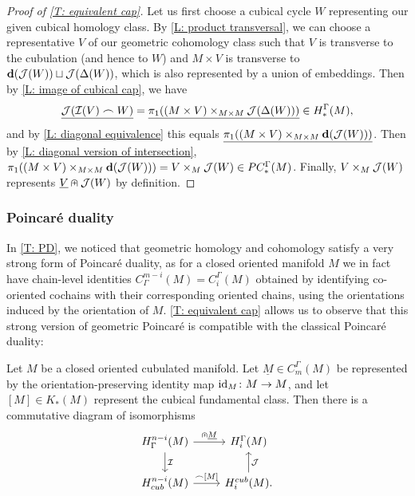 \begin{proof}[Proof of \cref{T: equivalent cap}]
	Let us first choose a cubical cycle $W$ representing our given cubical homology class.
	By \cref{L: product transversal}, we can choose a representative $V$ of our geometric cohomology class such that $V$ is transverse to the cubulation (and hence to $W$) and $M \times V$ is transverse to $\mathbf{d}(\mathcal{J}(W)) \sqcup \mathcal{J}(\Delta(W))$, which is also represented by a union of embeddings.
	Then by \cref{L: image of cubical cap}, we have
	$$\underline{\mathcal{J}(\mathcal{I}(V)\frown W)} = \underline{\pi_1( (M \times V)\times_{M \times M}\mathcal{J}(\Delta(W)))} \in H_*^\Gamma(M),$$
	and by \cref{L: diagonal equivalence} this equals $\underline{\pi_1((M \times V)\times_{M \times M} \mathbf{d}(\mathcal{J}(W)))}$.
	Then by \cref{L: diagonal version of intersection},
	$\pi_1((M \times V)\times_{M \times M} \mathbf{d}(\mathcal{J}(W))) = V \times_M \mathcal{J}(W) \in PC_*^\Gamma(M)$.
	Finally, $V \times_M \mathcal{J}(W)$ represents $\underline{V}\nplus \mathcal{J}(W)$ by definition.
\end{proof}

\subsubsection{Poincar\'e duality}\label{S: PD}

In \cref{T: PD}, we noticed that geometric homology and cohomology satisfy a very strong form of Poincar\'e duality, as for a closed oriented manifold $M$ we in fact have chain-level identities $C^{m-i}_\Gamma(M) = C_i^\Gamma(M)$ obtained by identifying co-oriented cochains with their corresponding oriented chains, using the orientations induced by the orientation of $M$.
\cref{T: equivalent cap} allows us to observe that this strong version of geometric Poincar\'e is compatible with the classical Poincar\'e duality:

\begin{corollary}\label{C: PD}
	Let $M$ be a closed oriented cubulated manifold.
	Let $\underline M \in C_m^\Gamma(M)$ be represented by the orientation-preserving identity map $\mathrm{id}_M \colon M \to M$, and let $[M] \in K_*(M)$ represent the cubical fundamental class.
	Then there is a commutative diagram of isomorphisms
	\[
	\begin{tikzcd}
		H^{n-i}_\Gamma(M) \arrow{r}{\nplus \uM} \arrow[d, "\mc I"] & H_i^\Gamma(M) \\
		H^{n-i}_{cub}(M) \arrow{r}{\frown [M]} & H_i^{cub}(M). \arrow[u, "\mc J"']
	\end{tikzcd}
	\]
\end{corollary}

